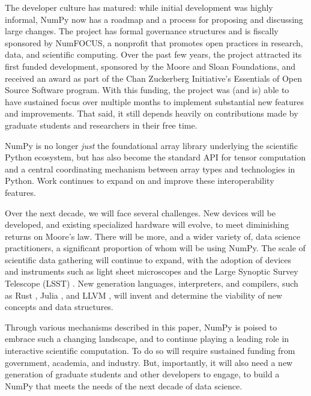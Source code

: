 The developer culture has matured: while initial development was
highly informal, NumPy now has a roadmap and a process for proposing
and discussing large changes.  The project has formal governance
structures and is fiscally sponsored by NumFOCUS, a nonprofit that
promotes open practices in research, data, and scientific computing.
Over the past few years, the project attracted its first funded
development, sponsored by the Moore and Sloan Foundations, and
received an award as part of the Chan Zuckerberg Initiative's
Essentials of Open Source Software program.  With this funding, the
project was (and is) able to have sustained focus over multiple months
to implement substantial new features and improvements.  That said, it
still depends heavily on contributions made by graduate students and
researchers in their free time.

NumPy is no longer \emph{just} the foundational array library underlying
the scientific Python ecosystem, but has also become the standard API
for tensor computation and a central coordinating mechanism between
array types and technologies in Python. Work continues to expand on and
improve these interoperability features.

Over the next decade, we will face several challenges.  New devices will be
developed, and existing specialized hardware will evolve, to meet diminishing
returns on Moore's law.  There will be more, and a wider variety of, data
science practitioners, a significant proportion of whom will be using NumPy.
The scale of scientific data gathering will continue to expand, with the
adoption of devices and instruments such as light sheet microscopes and the
Large Synoptic Survey Telescope (LSST) \cite{jenness2018lsst}.  New generation
languages, interpreters, and compilers, such as Rust
\cite{10.1145/2692956.2663188}, Julia \cite{Julia-2017}, and LLVM
\cite{LLVM:CGO04}, will invent and determine the viability of new concepts and
data structures.

Through various mechanisms described in this paper, NumPy is poised to
embrace such a changing landscape, and to continue playing a leading
role in interactive scientific computation.  To do so will require
sustained funding from government, academia, and industry.  But,
importantly, it will also need a new generation of graduate students
and other developers to engage, to build a NumPy that meets the needs
of the next decade of data science.
